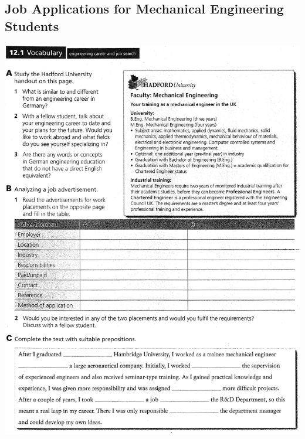 \subsection{Job Applications for Mechanical Engineering Students}
\includegraphics[scale=.85]{handouts/Eng311.jpg}


